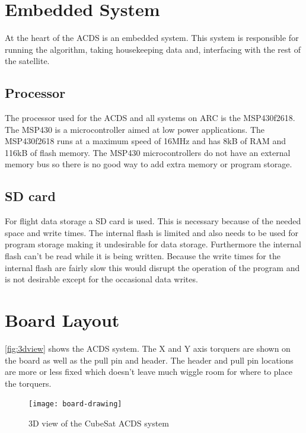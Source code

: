 \section{Embedded System}

At the heart of the \ac{ACDS} is an embedded system. This system is responsible for running the algorithm, taking housekeeping data and, interfacing with the rest of the satellite.

\subsection{Processor}

The processor used for the \ac{ACDS} and all systems on \ac{ARC} is the MSP430f2618. The MSP430 is a microcontroller aimed at low power applications. The MSP430f2618 runs at a maximum speed of 16MHz and has 8kB of RAM and 116kB of flash memory. The MSP430 microcontrollers do not have an external memory bus so there is no good way to add extra memory or program storage. 

\subsection{SD card}

For flight data storage a SD card is used. This is necessary because of the needed space and write times. The internal flash is limited and also needs to be used for program storage making it undesirable for data storage. Furthermore the internal flash can't be read while it is being written. Because the write times for the internal flash are fairly slow this would disrupt the operation of the program and is not desirable except for the occasional data writes.

\section{Board Layout}

\autoref{fig:3dview} shows the \ac{ACDS} system. The X and Y axis torquers are shown on the board as well as the pull pin and header. The header and pull pin locations are more or less fixed which doesn't leave much wiggle room for where to place the torquers.

\begin{figure}[H]
    \centering
    \texttt{[image: board-drawing]}
    \caption{3D view of the CubeSat \acs{ACDS} system}
    \label{fig:3dview}
\end{figure}

